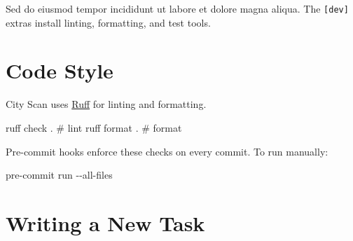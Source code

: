 \documentclass[
  letterpaper,
  DIV=11,
  numbers=noendperiod]{scrreprt}
\newenvironment{Shaded}{\begin{snugshade}}{\end{snugshade}}
\newcommand{\AttributeTok}[1]{\textcolor[rgb]{0.40,0.45,0.13}{#1}}
\newcommand{\CommentTok}[1]{\textcolor[rgb]{0.37,0.37,0.37}{#1}}
\newcommand{\ExtensionTok}[1]{\textcolor[rgb]{0.00,0.23,0.31}{#1}}
\newcommand{\NormalTok}[1]{\textcolor[rgb]{0.00,0.23,0.31}{#1}}
\begin{document}
Sed do eiusmod tempor incididunt ut labore et dolore magna aliqua. The
\texttt{{[}dev{]}} extras install linting, formatting, and test tools.

\section{Code Style}\label{code-style}

City Scan uses \href{https://docs.astral.sh/ruff/}{Ruff} for linting and
formatting.

\begin{Shaded}
\begin{Highlighting}[]
\ExtensionTok{ruff}\NormalTok{ check .         }\CommentTok{\# lint}
\ExtensionTok{ruff}\NormalTok{ format .        }\CommentTok{\# format}
\end{Highlighting}
\end{Shaded}

Pre-commit hooks enforce these checks on every commit. To run manually:

\begin{Shaded}
\begin{Highlighting}[]
\ExtensionTok{pre{-}commit}\NormalTok{ run }\AttributeTok{{-}{-}all{-}files}
\end{Highlighting}
\end{Shaded}

\section{Writing a New Task}\label{writing-a-new-task}
\end{document}
